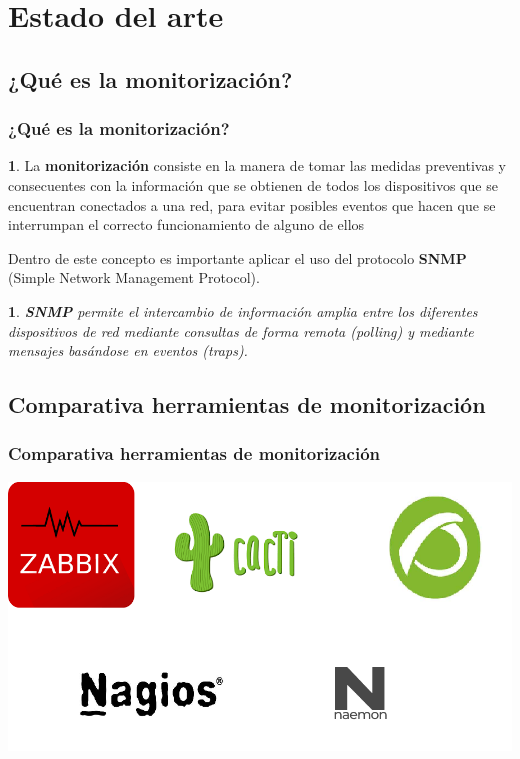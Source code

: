\documentclass{beamer}
\theoremstyle{plain}
\theoremstyle{definition}
\newtheorem{defn}[thm]{}
\theoremstyle{plain}
\newtheorem{prop}[thm]{}
\theoremstyle{definition}
\theoremstyle{remark}
\theoremstyle{definition}
\begin{document}
\section{Estado del arte}
\subsection{¿Qué es la monitorización?}
\begin{frame}
	\frametitle{¿Qué es la monitorización?}
	\begin{defn}
		La \textbf{monitorización} consiste en la manera de tomar las medidas preventivas y
		consecuentes con la información que se obtienen de todos los dispositivos
		que se encuentran conectados a una red, para evitar posibles eventos que
		hacen que se interrumpan el correcto funcionamiento de alguno de ellos
	\end{defn}
Dentro de este concepto es importante aplicar el uso del protocolo \textbf{SNMP} (Simple Network
Management Protocol).
\begin{prop}
	\textbf{SNMP} permite el intercambio de información amplia entre los diferentes dispositivos de red mediante consultas de forma remota (polling) y mediante mensajes basándose en eventos (traps).
\end{prop}

	
\end{frame}

\subsection{Comparativa herramientas de monitorización}
\begin{frame}
	\frametitle{Comparativa herramientas de monitorización}
	\centering
	\includegraphics[scale=0.5]{imagenes/comparativaMonitorizacion.png}
\end{frame}
\end{document}
